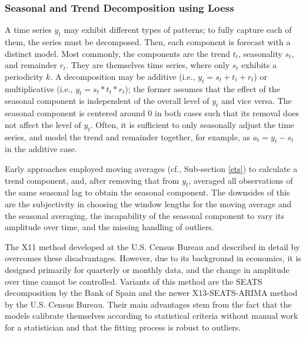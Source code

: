 \subsubsection{Seasonal and Trend Decomposition using Loess}
\label{stl}

A time series $y_t$ may exhibit different types of patterns; to fully capture
    each of them, the series must be decomposed.
Then, each component is forecast with a distinct model.
Most commonly, the components are the trend $t_t$, seasonality $s_t$, and
    remainder $r_t$.
They are themselves time series, where only $s_t$ exhibits a periodicity $k$.
A decomposition may be additive (i.e., $y_t = s_t + t_t + r_t$) or
    multiplicative (i.e., $y_t = s_t * t_t * r_t$); the former assumes that
    the effect of the seasonal component is independent of the overall level
    of $y_t$ and vice versa.
The seasonal component is centered around $0$ in both cases such that its
    removal does not affect the level of $y_t$.
Often, it is sufficient to only seasonally adjust the time series, and model
    the trend and remainder together, for example, as $a_t = y_t - s_t$ in the
    additive case.

Early approaches employed moving averages (cf., Sub-section \ref{ets}) to
    calculate a trend component, and, after removing that from $y_t$, averaged
    all observations of the same seasonal lag to obtain the seasonal
    component.
The downsides of this are the subjectivity in choosing the window lengths for
    the moving average and the seasonal averaging, the incapability of the
    seasonal component to vary its amplitude over time, and the missing
    handling of outliers.

The X11 method developed at the U.S. Census Bureau and described in detail by
    \cite{dagum2016} overcomes these disadvantages.
However, due to its background in economics, it is designed primarily for
    quarterly or monthly data, and the change in amplitude over time cannot be
    controlled.
Variants of this method are the SEATS decomposition by the Bank of Spain and
    the newer X13-SEATS-ARIMA method by the U.S. Census Bureau.
Their main advantages stem from the fact that the models calibrate themselves
    according to statistical criteria without manual work for a statistician
    and that the fitting process is robust to outliers.

